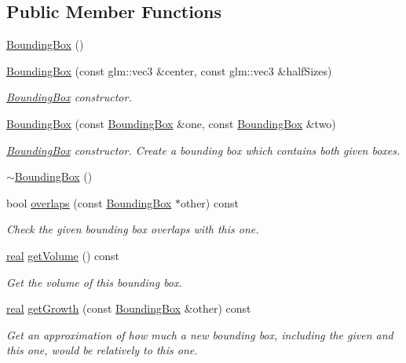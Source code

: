 \subsection*{Public Member Functions}
\begin{DoxyCompactItemize}
\item 
\mbox{\hyperlink{classr3_1_1_bounding_box_a088852419e2b7af17f2e94d672a70bcf}{Bounding\+Box}} ()
\item 
\mbox{\hyperlink{classr3_1_1_bounding_box_a871e0ce668df300a9a88eef1069d1874}{Bounding\+Box}} (const glm\+::vec3 \&center, const glm\+::vec3 \&half\+Sizes)
\begin{DoxyCompactList}\small\item\em \mbox{\hyperlink{classr3_1_1_bounding_box}{Bounding\+Box}} constructor. \end{DoxyCompactList}\item 
\mbox{\hyperlink{classr3_1_1_bounding_box_a23750f8e74b918e0b39ce2c2fe609574}{Bounding\+Box}} (const \mbox{\hyperlink{classr3_1_1_bounding_box}{Bounding\+Box}} \&one, const \mbox{\hyperlink{classr3_1_1_bounding_box}{Bounding\+Box}} \&two)
\begin{DoxyCompactList}\small\item\em \mbox{\hyperlink{classr3_1_1_bounding_box}{Bounding\+Box}} constructor. Create a bounding box which contains both given boxes. \end{DoxyCompactList}\item 
\mbox{\hyperlink{classr3_1_1_bounding_box_a9257cfab936d3331cba765cb19527aa1}{$\sim$\+Bounding\+Box}} ()
\item 
bool \mbox{\hyperlink{classr3_1_1_bounding_box_a6e69163febe125531fa355ae9876b8be}{overlaps}} (const \mbox{\hyperlink{classr3_1_1_bounding_box}{Bounding\+Box}} $\ast$other) const
\begin{DoxyCompactList}\small\item\em Check the given bounding box overlaps with this one. \end{DoxyCompactList}\item 
\mbox{\hyperlink{namespacer3_ab2016b3e3f743fb735afce242f0dc1eb}{real}} \mbox{\hyperlink{classr3_1_1_bounding_box_a3e6a9b79373dde150d18d5d5df59a2f3}{get\+Volume}} () const
\begin{DoxyCompactList}\small\item\em Get the volume of this bounding box. \end{DoxyCompactList}\item 
\mbox{\hyperlink{namespacer3_ab2016b3e3f743fb735afce242f0dc1eb}{real}} \mbox{\hyperlink{classr3_1_1_bounding_box_a21631e2fffeb995d3a9647489f936d13}{get\+Growth}} (const \mbox{\hyperlink{classr3_1_1_bounding_box}{Bounding\+Box}} \&other) const
\begin{DoxyCompactList}\small\item\em Get an approximation of how much a new bounding box, including the given and this one, would be relatively to this one. \end{DoxyCompactList}\end{DoxyCompactItemize}
